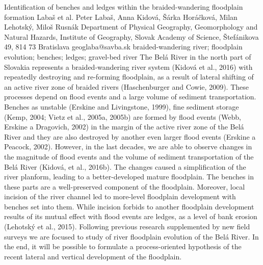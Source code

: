 \abstract
{Identification of benches and ledges within the braided-wandering floodplain formation} %
{Labaš et al.} %
{Peter Labaš, Anna Kidová, Šárka Horáčková, Milan Lehotský, Miloš Rusnák
} %
{\KLtag} %
{Department of Physical Geography, Geomorphology and Natural Hazards, Institute of Geography, Slovak Academy of Science, Štefánikova 49, 814 73 Bratislava} %
{geoglaba@savba.sk}  %
{braided-wandering river; floodplain evolution; benches; ledges; gravel-bed river}%
{The Belá River in the north part of Slovakia represents a braided-wandering river system (Kidová et al., 2016) with repeatedly destroying and re-forming floodplain, as a result of lateral shifting of an active river zone of braided rivers (Haschenburger and Cowie, 2009). These processes depend on flood events and a large volume of sediment transportation. Benches as unstable (Erskine and Livingstone, 1999), fine sediment storage (Kemp, 2004; Vietz et al., 2005a, 2005b) are formed by flood events (Webb, Erskine a Dragovich, 2002) in the margin of the active river zone of the Belá River and they are also destroyed by another even larger flood events (Erskine a Peacock, 2002). However, in the last decades, we are able to observe changes in the magnitude of flood events and the volume of sediment transportation of the Belá River (Kidová, et al., 2016b). The changes caused a simplification of the river planform, leading to a better-developed mature floodplain. The benches in these parts are a well-preserved component of the floodplain. Moreover, local incision of the river channel led to more-level floodplain development with benches set into them. While incision forbids to another floodplain development results of its mutual effect with flood events are ledges, as a level of bank erosion (Lehotský et al., 2015). Following previous research supplemented by new field surveys we are focused to study of river floodplain evolution of the Belá River. In the end, it will be possible to formulate a process-oriented hypothesis of the recent lateral and vertical development of the floodplain.
}%
